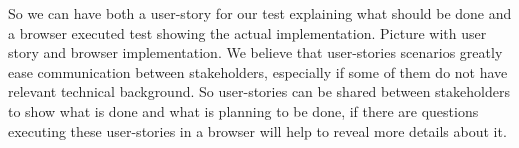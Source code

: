 So we can have both a user-story for our test explaining what should be done and a browser executed
test showing the actual implementation. Picture with user story and browser implementation. We believe that user-stories 
scenarios greatly ease communication between stakeholders, 
especially if some of them do not have relevant technical background.
So user-stories can be shared between stakeholders to show what is done and what
is planning to be done, if there are questions executing these user-stories in a browser will help to reveal more details about it. 
   
   
   
    
